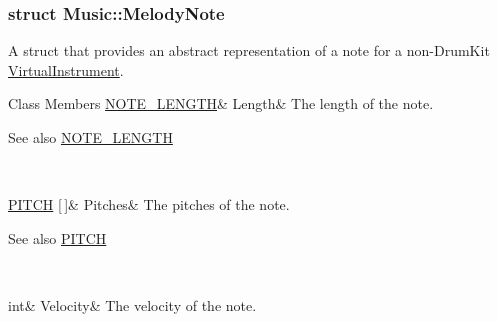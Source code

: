 \subsubsection{struct Music\+:\+:Melody\+Note}
A struct that provides an abstract representation of a note for a non-\/\+Drum\+Kit \hyperlink{group___audio_management_class_virtual_instrument}{Virtual\+Instrument}. \begin{DoxyFields}{Class Members}
\mbox{\label{group___enums_ac35cd02f5b3c00e3040b51e40e9e6c94}} 
\hyperlink{group___enums_gaf11b5f079adbb21c800b9eca1c5c3cbd}{NOTE\_LENGTH}&
Length&
The length of the note. \begin{DoxySeeAlso}{See also}
\hyperlink{group___enums_gaf11b5f079adbb21c800b9eca1c5c3cbd}{N\+O\+T\+E\+\_\+\+L\+E\+N\+G\+TH} 
\end{DoxySeeAlso}
\\
\hline

\mbox{\label{group___enums_aab23b49ea9d7961aef5091154ce45946}} 
\hyperlink{group___enums_ga508f69b199ea518f935486c990edac1d}{PITCH} \mbox{[}$\,$\mbox{]}&
Pitches&
The pitches of the note. \begin{DoxySeeAlso}{See also}
\hyperlink{group___enums_ga508f69b199ea518f935486c990edac1d}{P\+I\+T\+CH} 
\end{DoxySeeAlso}
\\
\hline

\mbox{\label{group___enums_a0c87d54ce8d28ea08fb4a526cb821c20}} 
int&
Velocity&
The velocity of the note. \\
\hline

\end{DoxyFields}
\label{struct_music_1_1_percussion_note}
